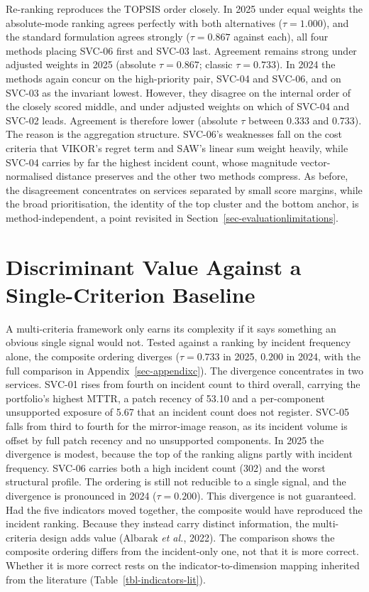 \documentclass[
  12pt,
  letterpaper,
  12pt,
  oneside,
  english,
  onehalfspacing,
  headsepline]{MastersDoctoralThesis}
\begin{document}
Re-ranking reproduces the TOPSIS order closely. In 2025 under equal
weights the absolute-mode ranking agrees perfectly with both
alternatives (\(\tau = 1.000\)), and the standard formulation agrees
strongly (\(\tau = 0.867\) against each), all four methods placing
SVC-06 first and SVC-03 last. Agreement remains strong under adjusted
weights in 2025 (absolute \(\tau = 0.867\); classic \(\tau = 0.733\)).
In 2024 the methods again concur on the high-priority pair, SVC-04 and
SVC-06, and on SVC-03 as the invariant lowest. However, they disagree on
the internal order of the closely scored middle, and under adjusted
weights on which of SVC-04 and SVC-02 leads. Agreement is therefore
lower (absolute \(\tau\) between 0.333 and 0.733). The reason is the
aggregation structure. SVC-06's weaknesses fall on the cost criteria
that VIKOR's regret term and SAW's linear sum weight heavily, while
SVC-04 carries by far the highest incident count, whose magnitude
vector-normalised distance preserves and the other two methods compress.
As before, the disagreement concentrates on services separated by small
score margins, while the broad prioritisation, the identity of the top
cluster and the bottom anchor, is method-independent, a point revisited
in Section~\ref{sec-evaluationlimitations}.

\section{Discriminant Value Against a Single-Criterion
Baseline}\label{sec-discriminant}

A multi-criteria framework only earns its complexity if it says
something an obvious single signal would not. Tested against a ranking
by incident frequency alone, the composite ordering diverges
(\(\tau = 0.733\) in 2025, \(0.200\) in 2024, with the full comparison
in Appendix~\ref{sec-appendixc}). The divergence concentrates in two
services. SVC-01 rises from fourth on incident count to third overall,
carrying the portfolio's highest MTTR, a patch recency of 53.10 and a
per-component unsupported exposure of 5.67 that an incident count does
not register. SVC-05 falls from third to fourth for the mirror-image
reason, as its incident volume is offset by full patch recency and no
unsupported components. In 2025 the divergence is modest, because the
top of the ranking aligns partly with incident frequency. SVC-06 carries
both a high incident count (302) and the worst structural profile. The
ordering is still not reducible to a single signal, and the divergence
is pronounced in 2024 (\(\tau = 0.200\)). This divergence is not
guaranteed. Had the five indicators moved together, the composite would
have reproduced the incident ranking. Because they instead carry
distinct information, the multi-criteria design adds value (Albarak
\emph{et al.}, 2022). The comparison shows the composite ordering
differs from the incident-only one, not that it is more correct. Whether
it is more correct rests on the indicator-to-dimension mapping inherited
from the literature (Table~\ref{tbl-indicators-lit}).
\end{document}

